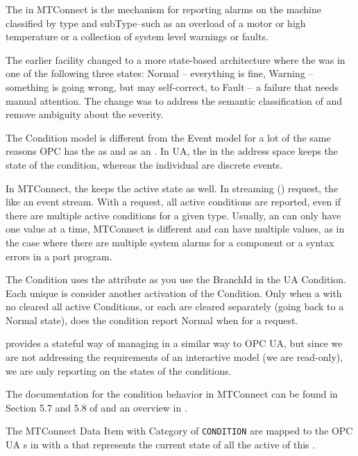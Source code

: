 The    in MTConnect is the mechanism for reporting alarms on the machine classified by type and subType--such as an overload of a motor or high temperature or a collection of system level warnings or faults.

The earlier   facility changed to a more state-based architecture where the  was in one of the following three states: Normal – everything is fine, Warning – something is going wrong, but may self-correct, to Fault – a failure that needs manual attention. The change was to address the semantic classification of  and remove ambiguity about the  severity.

The Condition model is different from the Event model for a lot of the same reasons OPC has the  as  and as an . In UA, the  in the address space keeps the state of the condition, whereas the individual  are discrete events.

In MTConnect, the  keeps the active state as well. In streaming () request, the  like an event stream. With a  request, all active conditions are reported, even if there are multiple active conditions for a given type. Usually, an  can only have one value at a time, MTConnect  is different and can have multiple values, as in the case where there are multiple system alarms for a component or a syntax errors in a part program.

The Condition uses the attribute  as you use the BranchId in the UA Condition. Each unique  is consider another activation of the Condition. Only when a  with no  cleared all active Conditions, or each are cleared separately (going back to a Normal state), does the condition report Normal when for a  request.

 provides a stateful way of managing  in a similar way to OPC UA, but since we are not addressing the requirements of an interactive model (we are read-only), we are only reporting on the states of the conditions. 

The documentation for the condition behavior in MTConnect can be found in Section 5.7 and 5.8 of \cite{MTCPart3} and an overview in \cite{MTCPart2}.

The MTConnect Data Item with Category of \texttt{CONDITION} are mapped to the OPC UA s  in \cite{UAPart9} with a  that represents the current state of all the active  of this .